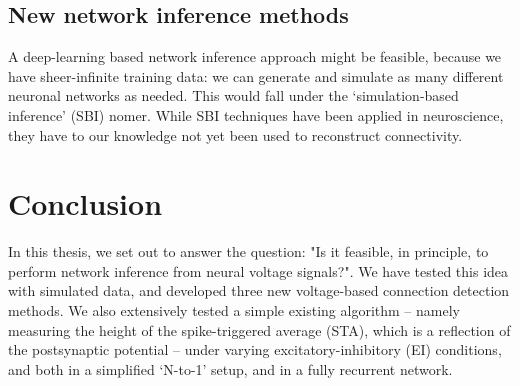 \subsection{New network inference methods}


A deep-learning based network inference approach might be feasible, because we have sheer-infinite training data: we can generate and simulate as many different neuronal networks as needed. This would fall under the `simulation-based inference' (SBI) nomer.\cite{Cranmer2020FrontierSimulationbasedInference} While SBI techniques have been applied in neuroscience\cite{Goncalves2020TrainingDeepNeural}, they have to our knowledge not yet been used to reconstruct connectivity.




\section{Conclusion}

In this thesis, we set out to answer the question: "Is it feasible, in principle, to perform network inference from neural voltage signals?". We have tested this idea with simulated data, and developed three new voltage-based connection detection methods.
We also extensively tested a simple existing algorithm -- namely measuring the height of the spike-triggered average (STA), which is a reflection of the postsynaptic potential -- under varying excitatory-inhibitory (EI) conditions, and both in a simplified `N-to-1' setup, and in a fully recurrent network.

